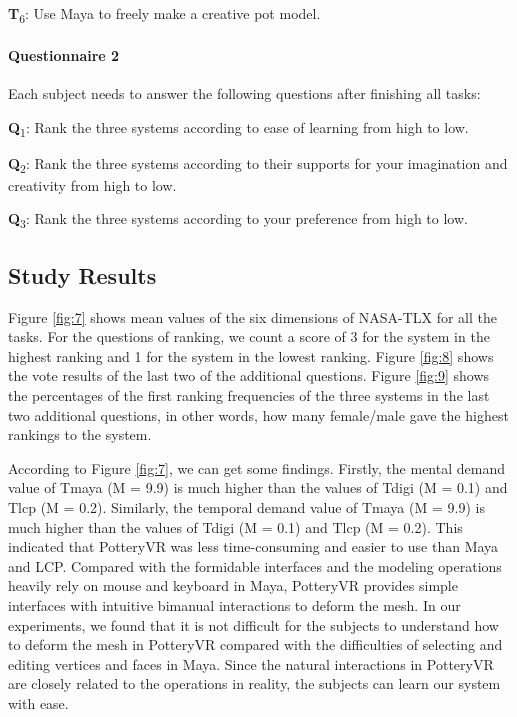 \textbf{T}\textsubscript{6}: Use Maya to freely make a creative pot model.

\paragraph{Questionnaire 2} Each subject needs to answer the following questions after finishing all tasks:

\textbf{Q}\textsubscript{1}: Rank the three systems according to ease of learning from high to low.

\textbf{Q}\textsubscript{2}: Rank the three systems according to their supports for your imagination and creativity from high to low.

\textbf{Q}\textsubscript{3}: Rank the three systems according to your preference from high to low.




\subsection{Study Results}
\label{sec:6.4}

Figure \ref{fig:7} shows mean values of the six dimensions of NASA-TLX for all the tasks. For the questions of ranking, we count a score of 3 for the system in the highest ranking and 1 for the system in the lowest ranking. Figure \ref{fig:8} shows the vote results of the last two of the additional questions. Figure \ref{fig:9} shows the percentages of the first ranking frequencies of the three systems in the last two additional questions, in other words, how many female/male gave the highest rankings to the system.

According to Figure \ref{fig:7}, we can get some findings. 
Firstly, the mental demand value of Tmaya (M = 9.9) is much higher than the values of Tdigi (M = 0.1) and Tlcp (M = 0.2). Similarly, the temporal demand value of Tmaya (M = 9.9) is much higher than the values of Tdigi (M = 0.1) and Tlcp (M = 0.2). This indicated that PotteryVR was less time-consuming and easier to use than Maya and LCP.
Compared with the formidable interfaces and the modeling operations heavily rely on mouse and keyboard in Maya, PotteryVR provides simple interfaces with intuitive bimanual interactions to deform the mesh. In our experiments, we found that it is not difficult for the subjects to understand how to deform the mesh in PotteryVR compared with the difficulties of selecting and editing vertices and faces in Maya. Since the natural interactions in PotteryVR are closely related to the operations in reality, the subjects can learn our system with ease.

